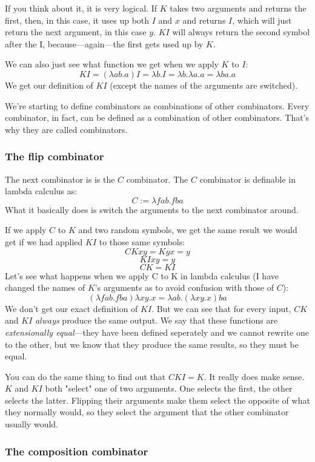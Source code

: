 \documentclass[11pt]{article}
\begin{document}
If you think about it, it is very logical. If \(K\) takes two arguments and
returns the first, then, in this case, it uses up both \(I\) and \(x\) and
returns \(I\), which will just return the next argument, in this case \(y\).
\(KI\) will always return the second symbol after the I, because---again---the
first gets used up by \(K\).

We can also just see what function we get when we apply \(K\) to \(I\):
\[KI=(\lambda ab.a)I=\lambda b.I=\lambda b.\lambda a.a=\lambda ba.a\] We get
our definition of \(KI\) (except the names of the arguments are switched).

We're starting to define combinators as combinations of other combinators.
Every combinator, in fact, can be defined as a combination of other
combinators. That's why they are called combinators.

\subsubsection{The flip combinator}\label{flipcombinator}

The next combinator is is the \(C\) combinator. The \(C\) combinator is
definable in lambda calculus as:
\[C:=\lambda fab.fba\]
What it basically does is switch the arguments to the next combinator around.

If we apply \(C\) to \(K\) and two random symbols, we get the same result we
would get if we had applied \(KI\) to those same symbols:
\[CKxy=Kyx=y\]
\[KIxy=y\]
\[CK=KI\]
Let's see what happens when we apply C to K in lambda calculus (I have changed
the names of \(K\)'s arguments as to avoid confusion with those of \(C\)):
\[(\lambda fab.fba)\lambda xy.x=\lambda ab.(\lambda xy.x)ba\]
We don't get our exact definition of \(KI\). But we can see that for every
input, \(CK\) and \(KI\) \emph{always} produce the same output. We say that
these functions are \emph{extensionally equal}---they have been defined
seperately and we cannot rewrite one to the other, but we know that they
produce the same results, so they must be equal.

You can do the same thing to find out that \(CKI=K\). It really does make
sense. \(K\) and \(KI\) both "select" one of two arguments. One selects the
first, the other selects the latter. Flipping their arguments make them select
the opposite of what they normally would, so they select the argument that the
other combinator usually would.

\subsubsection{The composition combinator}\label{composition}
\end{document}

